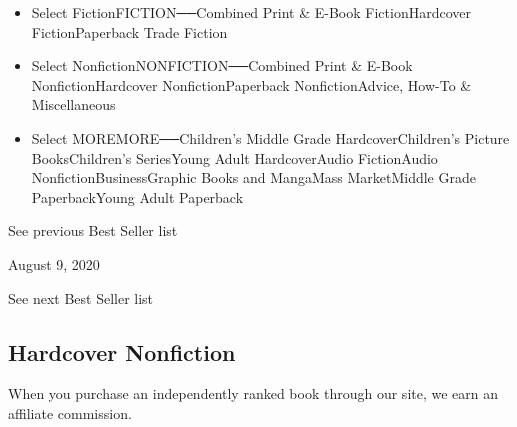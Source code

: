 \begin{itemize}
\tightlist
\item
  Select FictionFICTION──Combined Print \& E-Book FictionHardcover
  FictionPaperback Trade Fiction
\item
  Select NonfictionNONFICTION──Combined Print \& E-Book
  NonfictionHardcover NonfictionPaperback NonfictionAdvice, How-To \&
  Miscellaneous
\item
  Select MOREMORE──Children's Middle Grade HardcoverChildren's Picture
  BooksChildren's SeriesYoung Adult HardcoverAudio FictionAudio
  NonfictionBusinessGraphic Books and MangaMass MarketMiddle Grade
  PaperbackYoung Adult Paperback
\end{itemize}

\href{/books/best-sellers/2020/08/02/hardcover-nonfiction/}{}

See previous Best Seller list

August 9, 2020

See next Best Seller list

\hypertarget{hardcover-nonfiction}{%
\subsection{Hardcover Nonfiction}\label{hardcover-nonfiction}}

When you purchase an independently ranked book through our site, we earn
an affiliate commission.

